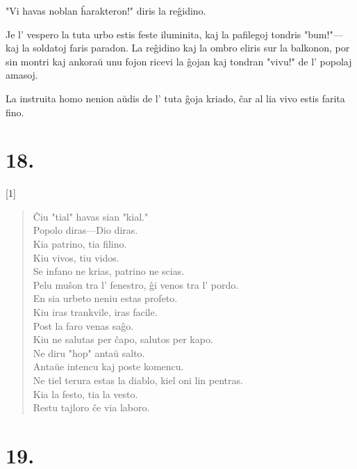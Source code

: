 "Vi havas noblan ĥarakteron!" diris la reĝidino.

Je l' vespero la tuta urbo estis feste iluminita, kaj la pafilegoj tondris "bum!"---kaj la soldatoj faris paradon. La reĝidino kaj la ombro eliris sur la balkonon, por sin montri kaj ankoraŭ unu fojon ricevi la ĝojan kaj tondran "vivu!" de l' popolaj amasoj.

La instruita homo nenion aŭdis de l' tuta ĝoja kriado, ĉar al lia vivo estis farita fino.

\begin{center}
\end{center}

\section*{18.}

{\centering\scalebox{1.6}[1]{}\par}

\begin{verse}
Ĉiu "tial" havas sian "kial."\\
Popolo diras---Dio diras.\\
Kia patrino, tia filino.\\
Kiu vivos, tiu vidos.\\
Se infano ne krias, patrino ne scias.\\
Pelu muŝon tra l' fenestro, ĝi venos tra l' pordo.\\
En sia urbeto neniu estas profeto.\\
Kiu iras trankvile, iras facile.\\
Post la faro venas saĝo.\\
Kiu ne salutas per ĉapo, salutos per kapo.\\
Ne diru "hop" antaŭ salto.\\
Antaŭe intencu kaj poste komencu.\\
Ne tiel terura estas la diablo, kiel oni lin pentras.\\
Kia la festo, tia la vesto.\\
Restu tajloro ĉe via laboro.\\
\end{verse}

\begin{center}
\end{center}

\section*{19.}

